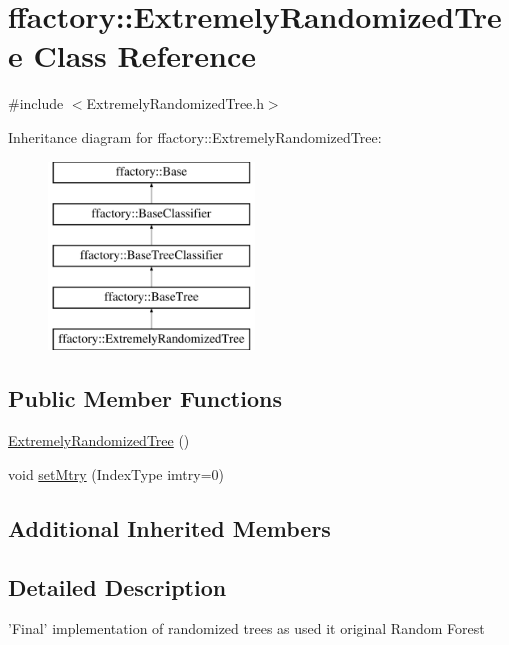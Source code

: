 \hypertarget{classffactory_1_1_extremely_randomized_tree}{\section{ffactory\-:\-:Extremely\-Randomized\-Tree Class Reference}
\label{classffactory_1_1_extremely_randomized_tree}
}


{\ttfamily \#include $<$Extremely\-Randomized\-Tree.\-h$>$}

Inheritance diagram for ffactory\-:\-:Extremely\-Randomized\-Tree\-:\begin{figure}[H]
\begin{center}
\leavevmode
\includegraphics[height=5.000000cm]{classffactory_1_1_extremely_randomized_tree}
\end{center}
\end{figure}
\subsection*{Public Member Functions}
\begin{DoxyCompactItemize}
\item 
\hyperlink{classffactory_1_1_extremely_randomized_tree_a866edb4c45c292babb31c4e25b72fc52}{Extremely\-Randomized\-Tree} ()
\item 
void \hyperlink{classffactory_1_1_extremely_randomized_tree_aefc1d960d78b32160de2b4eb60b99719}{set\-Mtry} (Index\-Type imtry=0)
\end{DoxyCompactItemize}
\subsection*{Additional Inherited Members}


\subsection{Detailed Description}
'Final' implementation of randomized trees as used it original Random Forest 

